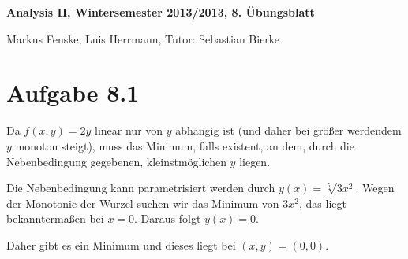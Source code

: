 \documentclass[a4paper,german,12pt,smallheadings]{scrartcl}
\begin{document}
\begin{center}
\bfseries %
\sffamily %
\vspace{-40pt}
Analysis II, Wintersemester 2013/2013, 8. Übungsblatt

Markus Fenske, Luis Herrmann, Tutor: Sebastian Bierke
\vspace{-10pt}
\end{center}
\allowdisplaybreaks %
\section*{Aufgabe 8.1}
Da $f(x,y) = 2y$ linear nur von $y$ abhängig ist (und daher bei größer
werdendem $y$ monoton steigt), muss das Minimum, falls existent, an dem, durch
die Nebenbedingung gegebenen, kleinstmöglichen $y$ liegen.

Die Nebenbedingung kann parametrisiert werden durch $y(x) = \sqrt[5]{3x^2}$.
Wegen der Monotonie der Wurzel suchen wir das Minimum von $3x^2$, das liegt
bekanntermaßen bei $x=0$. Daraus folgt $y(x) = 0$.

Daher gibt es ein Minimum und dieses liegt bei $(x,y) = (0,0)$.
\end{document}
